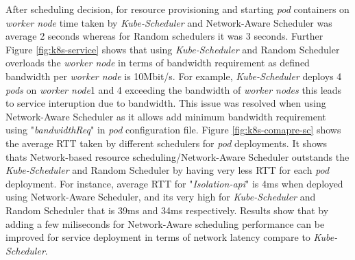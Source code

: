 After scheduling decision, for resource provisioning and starting \emph{pod} containers on \emph{worker node} time taken by \emph{Kube-Scheduler} and Network-Aware Scheduler was average 2 seconds whereas for Random schedulers it was 3 seconds\cite{Santos2019}. Further Figure \ref{fig:k8s-service} shows that using \emph{Kube-Scheduler} and Random Scheduler overloads the \emph{worker node} in terms of bandwidth requirement as defined bandwidth per \emph{worker node} is 10Mbit/s\cite{Santos2019}. For example, \emph{Kube-Scheduler} deploys 4 \emph{pods} on \emph{worker node}1 and 4 exceeding the bandwidth of \emph{worker nodes} this leads to service interuption due to bandwidth\cite{Santos2019}. This issue was resolved when using Network-Aware Scheduler as it allows add minimum bandwidth requirement using "\emph{bandwidthReq}" in \emph{pod} configuration file\cite{Santos2019}. Figure \ref{fig:k8s-comapre-sc} shows the average RTT taken by different schedulers for \emph{pod} deployments. It shows thats Network-based resource scheduling/Network-Aware Scheduler outstands the \emph{Kube-Scheduler} and Random Scheduler by having very less RTT for each \emph{pod} deployment\cite{Santos2019}. For instance, average RTT for "\emph{Isolation-api}" is 4ms when deployed using Network-Aware Scheduler, and its very high for \emph{Kube-Scheduler} and Random Scheduler that is 39ms and 34ms respectively\cite{Santos2019}. Results show that by adding a few miliseconds for Network-Aware scheduling performance can be improved for service deployment in terms of network latency compare to \emph{Kube-Scheduler}\cite{Santos2019}.
\vspace{-0.5cm}
